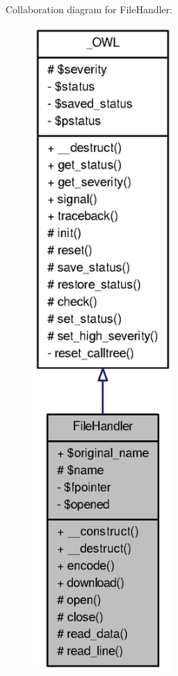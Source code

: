 Collaboration diagram for FileHandler:\nopagebreak
\begin{figure}[H]
\begin{center}
\leavevmode
\includegraphics[width=150pt]{classFileHandler__coll__graph}
\end{center}
\end{figure}
